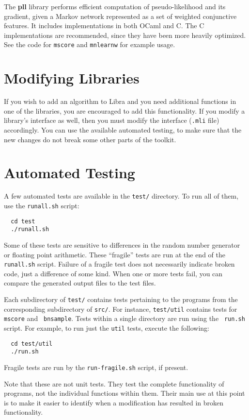 \documentclass[11pt]{article}
\begin{document}
The {\bf pll} library performs efficient computation of
pseudo-likelihood and its gradient, given a Markov network represented
as a set of weighted conjunctive features.  It includes
implementations in both OCaml and C.  The C implementations are
recommended, since they have been more heavily optimized.  See the
code for {\tt mscore} and {\tt mnlearnw} for example usage.

\section{Modifying Libraries}

If you wish to add an algorithm to Libra and you need additional
functions in one of the libraries, you are encouraged to add this
functionality.  If you modify a library's interface as well, then you
must modify the interface ({\tt .mli} file) accordingly.  You can use
the available automated testing, to make sure that the new changes do
not break some other parts of the toolkit.

\section{Automated Testing}

A few automated tests are available in the {\tt test/} directory.
To run all of them, use the {\tt runall.sh} script:
\begin{verbatim}
  cd test
  ./runall.sh
\end{verbatim}

Some of these tests are sensitive to differences in the random number
generator or floating point arithmetic.  These ``fragile'' tests are
run at the end of the {\tt runall.sh} script.  Failure of a fragile
test does not necessarily indicate broken code, just a difference of
some kind.  When one or more tests fail, you can compare the generated
output files to the test files.

Each subdirectory of {\tt test/} contains tests pertaining to the
programs from the corresponding subdirectory of {\tt src/}.  For
instance, {\tt test/util} contains tests for {\tt mscore} and {\tt
bnsample}.  Tests within a single directory are run using the {\tt
run.sh} script.  For example, to run just the {\tt util} tests,
execute the following:
\begin{verbatim}
  cd test/util
  ./run.sh
\end{verbatim}
Fragile tests are run by the {\tt run-fragile.sh} script, if present.

Note that these are not unit tests. They test the complete
functionality of programs, not the individual functions within them.
Their main use at this point is to make it easier to identify when a
modification has resulted in broken functionality.  
\end{document}
